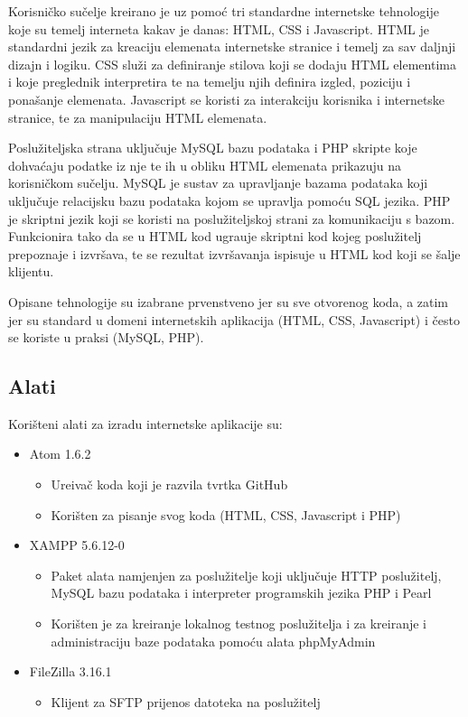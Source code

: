 Korisni\v{c}ko su\v{c}elje kreirano je uz pomo\'{c} tri standardne internetske tehnologije koje su temelj interneta kakav je danas: HTML, CSS i Javascript. HTML \cite{html} je standardni jezik za kreaciju elemenata internetske stranice i temelj za sav daljnji dizajn i logiku. CSS \cite{css} slu\v{z}i za definiranje stilova koji se dodaju HTML elementima i koje preglednik interpretira te na temelju njih definira izgled, poziciju i pona\v{s}anje elemenata. Javascript \cite{javascript} se koristi za interakciju korisnika i internetske stranice, te za manipulaciju HTML elemenata.

Poslu\v{z}iteljska strana uklju\v{c}uje MySQL bazu podataka i PHP skripte koje dohva\'{c}aju podatke iz nje te ih u obliku HTML elemenata prikazuju na korisni\v{c}kom su\v{c}elju. MySQL je sustav za upravljanje bazama podataka koji uklju\v{c}uje relacijsku bazu podataka kojom se upravlja pomo\'{c}u SQL jezika. PHP je skriptni jezik koji se koristi na poslu\v{z}iteljskoj strani za komunikaciju s bazom. Funkcionira tako da se u HTML kod ugra\dj uje skriptni kod kojeg poslu\v{z}itelj prepoznaje i izvr\v{s}ava, te se rezultat izvr\v{s}avanja ispisuje u HTML kod koji se \v{s}alje klijentu.

Opisane tehnologije su izabrane prvenstveno jer su sve otvorenog koda, a zatim jer su standard u domeni internetskih aplikacija (HTML, CSS, Javascript) i \v{c}esto se koriste u praksi (MySQL, PHP).

\subsection{Alati}
Kori\v{s}teni alati za izradu internetske aplikacije su:
\begin{itemize}
	\item Atom 1.6.2 \cite{atom}
	\begin{itemize}
		\item Ure\dj iva\v{c} koda koji je razvila tvrtka GitHub
		\item Kori\v{s}ten za pisanje svog koda (HTML, CSS, Javascript i PHP)
	\end{itemize}
	
	\item XAMPP 5.6.12-0 \cite{xampp}
	\begin{itemize}
		\item Paket alata namjenjen za poslu\v{z}itelje koji uklju\v{c}uje HTTP poslu\v{z}itelj, MySQL bazu podataka i interpreter programskih jezika PHP i Pearl
		\item Kori\v{s}ten je za kreiranje lokalnog testnog poslu\v{z}itelja i za kreiranje i administraciju baze podataka pomo\'{c}u alata phpMyAdmin
	\end{itemize}
	
	\item FileZilla 3.16.1 \cite{filezilla}
	\begin{itemize}
		\item Klijent za SFTP prijenos datoteka na poslu\v{z}itelj
	\end{itemize}
\end{itemize}
